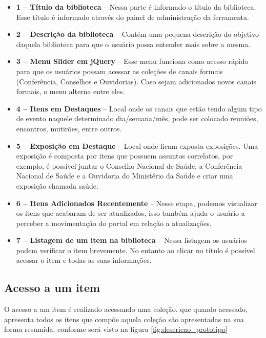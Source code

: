 \begin{itemize}
	\item \textbf{1 – Título da biblioteca} – Nessa parte é informado o título da biblioteca. Esse título é informado através do painel de administração da ferramenta.
	\item \textbf{2 – Descrição da biblioteca} – Contém uma pequena descrição do objetivo daquela biblioteca para que o usuário possa entender mais sobre a mesma.
	\item \textbf{3 – Menu Slider em jQuery} – Esse menu funciona como acesso rápido para que os usuários possam acessar as coleções de canais formais (Conferência, Conselhos e Ouvidorias). Caso sejam adicionados novos canais formais, o menu alterna entre eles.
	\item \textbf{4 – Itens em Destaques} – Local onde os canais que estão tendo algum tipo de evento naquele determinado dia/semana/mês, pode ser colocado reuniões, encontros, mutirões, entre outros.
	\item \textbf{5 – Exposição em Destaque} – Local onde ficam exposta exposições. Uma exposição é composta por itens que possuem assuntos correlatos, por exemplo, é possível juntar o Conselho Nacional de Saúde, a Conferência Nacional de Saúde e a Ouvidoria do Ministério da Saúde e criar uma exposição chamada saúde.	
	\item \textbf{6 – Itens Adicionados Recentemente} – Nesse etapa, podemos visualizar os itens que acabaram de ser atualizados, isso também ajuda o usuário a perceber a movimentação do portal em relação a atualizações.
	\item \textbf{7 – Listagem de um item na biblioteca} – Nessa listagem os usuários podem verificar o item brevemente. No entanto ao clicar no título é possível acessar o item e todas as suas informações.
\end{itemize}

\subsection*{Acesso a um item}

O acesso a um item é realizado acessando uma coleção. que quando acessado, apresenta todos os itens que compõe aquela coleção são apresentadas na sua forma resumida, conforme será visto na figura \ref{fig:descricao_prototipo}

